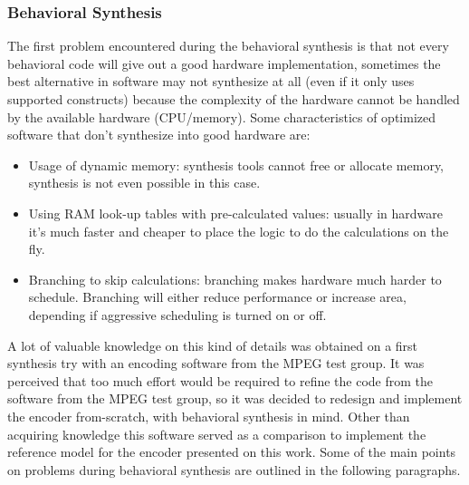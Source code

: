 \documentclass[a4paper, 12pt]{article}
\begin{document}
\subsubsection{Behavioral Synthesis}

The first problem encountered during the behavioral synthesis is that not every behavioral code will give out a good hardware implementation, sometimes the best alternative in software may not synthesize at all (even if it only uses supported constructs) because the complexity of the hardware cannot be handled by the available hardware (CPU/memory). Some characteristics of optimized software that don't synthesize into good hardware are:

\begin{itemize}
\item Usage of dynamic memory: synthesis tools cannot free or allocate memory, synthesis is not even possible in this case.
\item Using RAM look-up tables with pre-calculated values: usually in hardware it's much faster and cheaper to place the logic to do the calculations on the fly.
\item Branching to skip calculations: branching makes hardware much harder to schedule. Branching will either reduce performance or increase area, depending if aggressive scheduling is turned on or off.
\end{itemize}

A lot of valuable knowledge on this kind of details was obtained on a first synthesis try with an encoding software from the MPEG test group. 
It was perceived that too much effort would be required to refine the code from the software from the MPEG test group, so it was decided to redesign and implement the encoder from-scratch, with behavioral synthesis in mind. Other than acquiring knowledge this software served as a comparison to implement the reference model for the encoder presented on this work. Some of the main points on problems during behavioral synthesis are outlined in the following paragraphs. 
\end{document}
